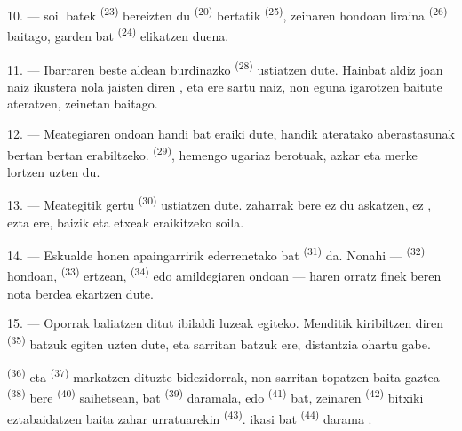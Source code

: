 10. ---  soil batek \textsuperscript{(23)} bereizten du
 \textsuperscript{(20)}  bertatik
\textsuperscript{(25)}, zeinaren hondoan  liraina
\textsuperscript{(26)} baitago,  garden bat \textsuperscript{(24)}
elikatzen duena.

11. --- Ibarraren beste aldean burdinazko 
\textsuperscript{(28)} ustiatzen dute. Hainbat aldiz joan naiz ikustera nola
jaisten diren  , eta  ere
sartu naiz, non eguna igarotzen baitute  ateratzen, zeinetan
 baitago.

12. --- Meategiaren ondoan  handi bat eraiki dute, handik
ateratako aberastasunak bertan bertan erabiltzeko. 
\textsuperscript{(29)}, hemengo  ugariaz berotuak, 
azkar eta merke lortzen uzten du.

13. --- Meategitik gertu  \textsuperscript{(30)} ustiatzen dute.
 zaharrak bere  ez du 
askatzen, ez , ezta  ere, baizik eta
etxeak eraikitzeko  soila.

14. --- Eskualde honen apaingarririk ederrenetako bat 
\textsuperscript{(31)} da. Nonahi ---  \textsuperscript{(32)}
hondoan,  \textsuperscript{(33)} ertzean, 
\textsuperscript{(34)} edo amildegiaren ondoan --- haren orratz finek beren nota
berdea ekartzen dute.

\VUsaut{3.0mm}
\VUsaut{3.0mm}

15. --- Oporrak baliatzen ditut ibilaldi luzeak egiteko. Menditik kiribiltzen
diren  \textsuperscript{(35)}  batzuk
egiten uzten dute, eta sarritan  batzuk ere, distantzia ohartu
gabe.

 \textsuperscript{(36)} eta 
\textsuperscript{(37)} markatzen dituzte bidezidorrak, non sarritan topatzen
baita  gaztea \textsuperscript{(38)} bere 
\textsuperscript{(40)} saihetsean,  bat \textsuperscript{(39)}
daramala, edo  \textsuperscript{(41)} bat, zeinaren  \textsuperscript{(42)} bitxiki eztabaidatzen baita 
zahar urratuarekin \textsuperscript{(43)}.  ikasi bat
\textsuperscript{(44)} darama .

